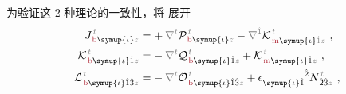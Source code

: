为验证这 2 种理论的一致性，将  展开
\begin{subequations} \label{eq:JKL}
\begin{align}
	{J}^{\;\!\mathcolor{gray}{t}}_{\;\!\textcolor{Maroon}{\text{b}} \symup{\iota} \mathcolor{gray}{z}} &=+\hspace{0.2em} \mathcolor{gray}{\nabla^t} {\mathcal{P}}^{\;\!\mathcolor{gray}{t}}_{\;\!\textcolor{Maroon}{\text{b}} \symup{\iota} \mathcolor{gray}{z}} - \mathcolor{gray}{\nabla^{\hat{1}}} {\mathcal{K}}^{\;\!\mathcolor{gray}{t}}_{\;\!\textcolor{Maroon}{\text{m}} \symup{\iota} \mathcolor{gray}{\hat{1}} \mathcolor{gray}{z}}~, \label{eq:Jb} \\
	{\mathcal{K}}^{\;\!\mathcolor{gray}{t}}_{\;\!\textcolor{Maroon}{\text{b}} \symup{\iota}\hat{1} \mathcolor{gray}{z}} &= -\hspace{0.2em} \mathcolor{gray}{\nabla^t} {\mathcal{Q}}^{\;\!\mathcolor{gray}{t}}_{\;\!\textcolor{Maroon}{\text{b}} \symup{\iota}\hat{1} \mathcolor{gray}{z}} + {\mathcal{K}}^{\;\!\mathcolor{gray}{t}}_{\;\!\textcolor{Maroon}{\text{m}} \symup{\iota}\hat{1} \mathcolor{gray}{z}}~, \label{eq:Kb} \\
	{\mathcal{L}}^{\;\!\mathcolor{gray}{t}}_{\;\!\textcolor{Maroon}{\text{b}} \symup{\iota}\hat{1}\hat{3} \mathcolor{gray}{z}} &= -\hspace{0.2em} \mathcolor{gray}{\nabla^t} {\mathcal{O}}^{\;\!\mathcolor{gray}{t}}_{\;\!\textcolor{Maroon}{\text{b}} \symup{\iota}\hat{1}\hat{3} \mathcolor{gray}{z}} + \epsilon^{\hphantom{\symup{\iota}\hat{1}}\hat{2}}_{\symup{\iota} \hat{1}} N^{\;\!\mathcolor{gray}{t}}_{\;\! \hat{2}\hat{3} \mathcolor{gray}{z}}~, \label{eq:Lb}
\end{align}
\end{subequations}

